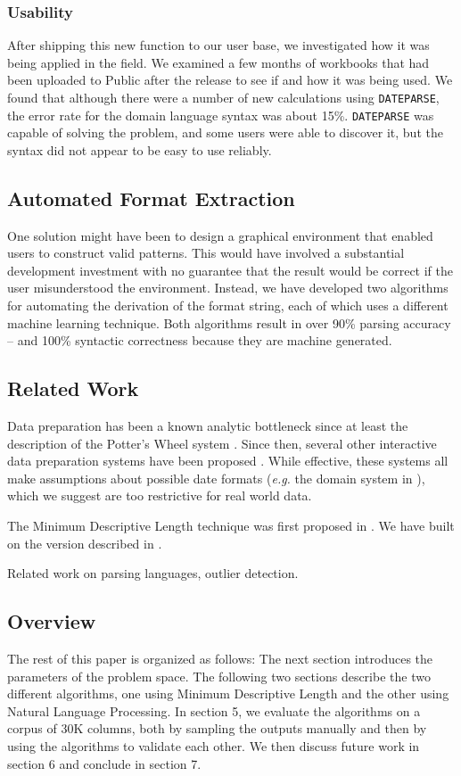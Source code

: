 \subsubsection{	Usability}
After shipping this new function to our user base, we investigated how it was being applied in the field. We examined a few months of workbooks that had been uploaded to Public after the release to see if and how it was being used. We found that although there were a number of new calculations using \texttt{DATEPARSE}, the error rate for the domain language syntax was about 15\%. \texttt{DATEPARSE} was capable of solving the problem, and some users were able to discover it, but the syntax did not appear to be easy to use reliably.

\subsection{Automated Format Extraction}
One solution might have been to design a graphical environment that enabled users to construct valid patterns. This would have involved a substantial development investment with no guarantee that the result would be correct if the user misunderstood the environment. Instead, we have developed two algorithms for automating the derivation of the format string, each of which uses a different machine learning technique. Both algorithms result in over 90\% parsing accuracy -- and 100\% syntactic correctness because they are machine generated.


\subsection{Related Work}
Data preparation has been a known analytic bottleneck since at least the description of the Potter's Wheel system \cite{PottersWheel}. Since then, several other interactive data preparation systems have been proposed \cite{Wrangler,Refine}. While effective, these systems all make assumptions about possible date formats (\textit{e.g.} the domain system in \cite{PottersWheel}), which we suggest are too restrictive for real world data.

The Minimum Descriptive Length technique was first proposed in \cite{mdl}.  We have built on the version described in \cite{PottersWheel}.

Related work on parsing languages, outlier detection.

\subsection{Overview}
The rest of this paper is organized as follows: The next section introduces the parameters of the problem space. The following two sections describe the two different algorithms, one using Minimum Descriptive Length and the other using Natural Language Processing. In section 5, we evaluate the algorithms on a corpus of 30K columns, both by sampling the outputs manually and then by using the algorithms to validate each other. We then discuss future work in section 6 and conclude in section 7.
